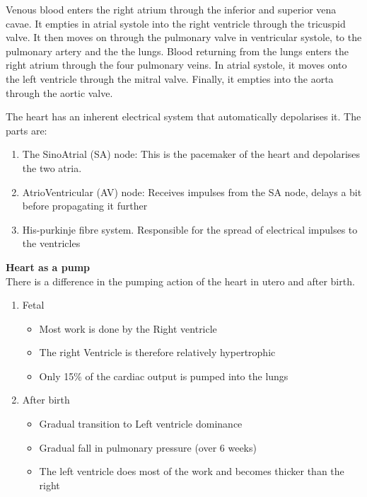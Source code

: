 \documentclass[
  letterpaper,
  DIV=11,
  numbers=noendperiod]{scrreprt}
\providecommand{\tightlist}{%
  \setlength{\itemsep}{0pt}\setlength{\parskip}{0pt}}\usepackage{longtable,booktabs,array}
\begin{document}
Venous blood enters the right atrium through the inferior and superior
vena cavae. It empties in atrial systole into the right ventricle
through the tricuspid valve. It then moves on through the pulmonary
valve in ventricular systole, to the pulmonary artery and the the lungs.
Blood returning from the lungs enters the right atrium through the four
pulmonary veins. In atrial systole, it moves onto the left ventricle
through the mitral valve. Finally, it empties into the aorta through the
aortic valve.

The heart has an inherent electrical system that automatically
depolarises it. The parts are:

\begin{enumerate}
\def\labelenumi{\arabic{enumi}.}
\tightlist
\item
  The SinoAtrial (SA) node: This is the pacemaker of the heart and
  depolarises the two atria.
\item
  AtrioVentricular (AV) node: Receives impulses from the SA node, delays
  a bit before propagating it further
\item
  His-purkinje fibre system. Responsible for the spread of electrical
  impulses to the ventricles
\end{enumerate}

\textbf{Heart as a pump}\\
There is a difference in the pumping action of the heart in utero and
after birth.

\begin{enumerate}
\def\labelenumi{\arabic{enumi}.}
\tightlist
\item
  Fetal

  \begin{itemize}
  \tightlist
  \item
    Most work is done by the Right ventricle
  \item
    The right Ventricle is therefore relatively hypertrophic
  \item
    Only 15\% of the cardiac output is pumped into the lungs
  \end{itemize}
\item
  After birth

  \begin{itemize}
  \tightlist
  \item
    Gradual transition to Left ventricle dominance
  \item
    Gradual fall in pulmonary pressure (over 6 weeks)
  \item
    The left ventricle does most of the work and becomes thicker than
    the right
  \end{itemize}
\end{enumerate}
\end{document}

